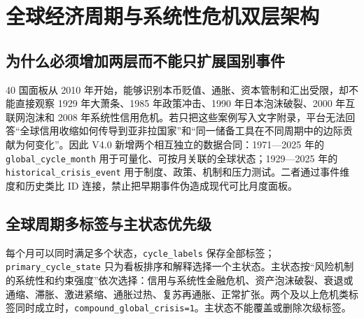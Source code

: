 \documentclass[UTF8,fontset=windows,12pt,openany]{ctexbook}
\newcommand{\Field}[1]{{\small\nolinkurl{#1}}}
\begin{document}
\chapter{全球经济周期与系统性危机双层架构}

\section{为什么必须增加两层而不能只扩展国别事件}

40 国面板从 2010 年开始，能够识别本币贬值、通胀、资本管制和汇出受限，却不能直接观察 1929 年大萧条、1985 年政策冲击、1990 年日本泡沫破裂、2000 年互联网泡沫和 2008 年系统性信用危机。若只把这些案例写入文字附录，平台无法回答“全球信用收缩如何传导到亚非拉国家”和“同一储备工具在不同周期中的边际贡献为何变化”。因此 V4.0 新增两个相互独立的数据合同：1971—2025 年的 \Field{global_cycle_month} 用于可量化、可按月关联的全球状态；1929—2025 年的 \Field{historical_crisis_event} 用于制度、政策、机制和压力测试。二者通过事件维度和历史类比 ID 连接，禁止把早期事件伪造成现代可比月度面板。

\section{全球周期多标签与主状态优先级}

每个月可以同时满足多个状态，\Field{cycle_labels} 保存全部标签；\Field{primary_cycle_state} 只为看板排序和解释选择一个主状态。主状态按“风险机制的系统性和约束强度”依次选择：信用与系统性金融危机、资产泡沫破裂、衰退或通缩、滞胀、激进紧缩、通胀过热、复苏再通胀、正常扩张。两个及以上危机类标签同时成立时，\Field{compound_global_crisis=1}。主状态不能覆盖或删除次级标签。
\end{document}
